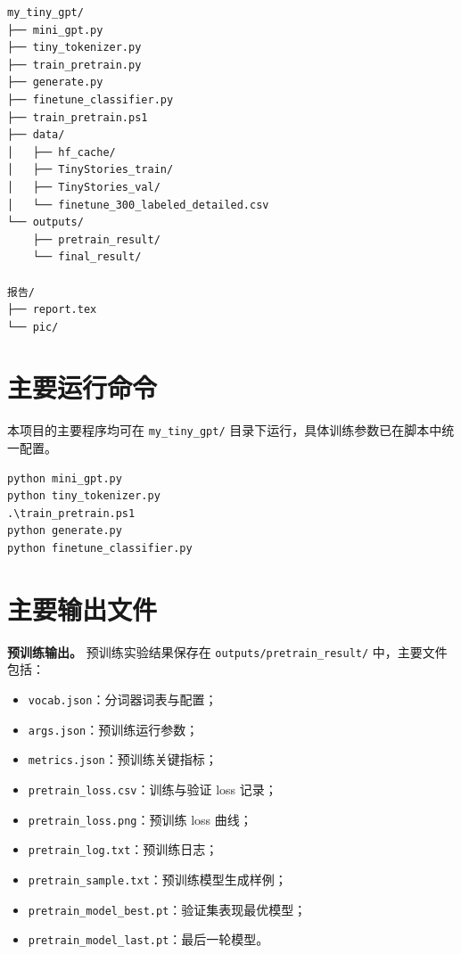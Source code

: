 \documentclass[UTF8,a4paper,zihao=-4,fontset=none]{ctexart}
\numberwithin{equation}{section}
\begin{document}
\begin{verbatim}
my_tiny_gpt/
├── mini_gpt.py
├── tiny_tokenizer.py
├── train_pretrain.py
├── generate.py
├── finetune_classifier.py
├── train_pretrain.ps1
├── data/
│   ├── hf_cache/
│   ├── TinyStories_train/
│   ├── TinyStories_val/
│   └── finetune_300_labeled_detailed.csv
└── outputs/
    ├── pretrain_result/
    └── final_result/

报告/
├── report.tex
└── pic/
\end{verbatim}

\section{主要运行命令}

本项目的主要程序均可在 \texttt{my\_tiny\_gpt/} 目录下运行，具体训练参数已在脚本中统一配置。

\begin{verbatim}
python mini_gpt.py
python tiny_tokenizer.py
.\train_pretrain.ps1
python generate.py
python finetune_classifier.py
\end{verbatim}

\section{主要输出文件}

\textbf{预训练输出。} 预训练实验结果保存在 \texttt{outputs/pretrain\_result/} 中，主要文件包括：
\begin{itemize}
  \item \texttt{vocab.json}：分词器词表与配置；
  \item \texttt{args.json}：预训练运行参数；
  \item \texttt{metrics.json}：预训练关键指标；
  \item \texttt{pretrain\_loss.csv}：训练与验证 loss 记录；
  \item \texttt{pretrain\_loss.png}：预训练 loss 曲线；
  \item \texttt{pretrain\_log.txt}：预训练日志；
  \item \texttt{pretrain\_sample.txt}：预训练模型生成样例；
  \item \texttt{pretrain\_model\_best.pt}：验证集表现最优模型；
  \item \texttt{pretrain\_model\_last.pt}：最后一轮模型。
\end{itemize}
\end{document}
